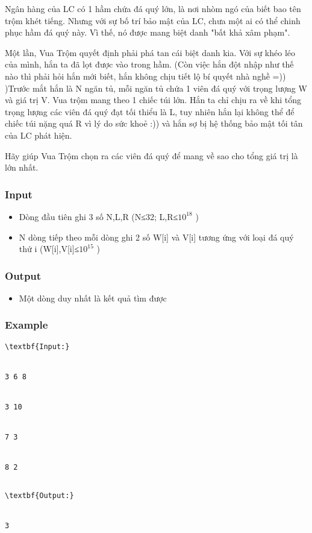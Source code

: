 



   Ngân hàng của LC có 1 hầm chứa đá quý lớn, là nơi nhòm ngó của biết bao tên trộm khét tiếng. Nhưng với sự bố trí bảo mật của LC, chưa một ai có thể chinh phục hầm đá quý này. Vì thế, nó được mang biệt danh "bất khả xâm phạm".  

   Một lần, Vua Trộm quyết định phải phá tan cái biệt danh kia. Với sự khéo léo của mình, hắn ta đã lọt được vào trong hầm. (Còn việc hắn đột nhập như thế nào thì phải hỏi hắn mới biết, hắn không chịu tiết lộ bí quyết nhà nghề =)) )Trước mắt hắn là N ngăn tủ, mỗi ngăn tủ chứa 1 viên đá quý với trọng lượng W và giá trị V. Vua trộm mang theo 1 chiếc túi lớn. Hắn ta chỉ chịu ra về khi tổng trọng lượng các viên đá quý đạt tối thiểu là L, tuy nhiên hắn lại không thể để chiếc túi nặng quá R vì lý do sức khoẻ :)) và hắn sợ bị hệ thống bảo mật tối tân của LC phát hiện.  

   Hãy giúp Vua Trộm chọn ra các viên đá quý để mang về sao cho tổng giá trị là lớn nhất.  

\subsubsection{   Input  }
\begin{itemize}
	\item     Dòng đầu tiên ghi 3 số N,L,R (N≤32; L,R≤$10^{18}$    )   
	\item     N dòng tiếp theo mỗi dòng ghi 2 số W[i] và V[i] tương ứng với loại đá quý thứ i (W[i],V[i]≤$10^{15}$    )   
\end{itemize}

\subsubsection{   Output  }
\begin{itemize}
	\item     Một dòng duy nhất là kết quả tìm được   
\end{itemize}

\subsubsection{   Example  }
\begin{verbatim}
\textbf{Input:}


3 6 8


3 10


7 3


8 2


\end{verbatim}
\begin{itemize}
\end{itemize}
\begin{verbatim}
\textbf{Output:}


3


\end{verbatim}

